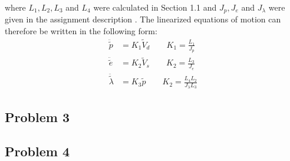 where $L_1, L_2, L_3$ and $L_4$ were calculated in Section 1.1  and $J_p, J_e$ and $J_\lambda$ were given in the assignment description .
The linearized equations of motion can therefore be written in the following form:
\begin{subequations}
\begin{align}
\ddot{\tilde{p}} &= K_1\tilde{V}_d \qquad K_1 = \frac{L_1}{J_p}\\
\ddot{\tilde{e}} &= K_2\tilde{V}_s \qquad K_2 = \frac{L_3}{J_e}\\
\ddot{\tilde{\lambda}} &= K_3\tilde{p} \qquad K_2 = \frac{L_4L_2}{J_\lambda L_3} 
\end{align}
\end{subequations}
\subsection{Problem 3}
\subsection{Problem 4}

	